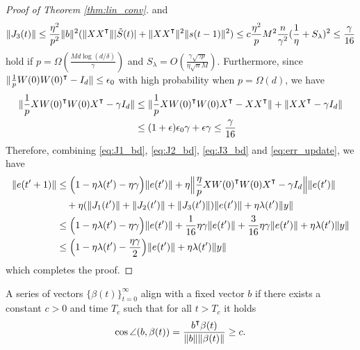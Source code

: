 \begin{proof}[Proof of Theorem \ref{thm:lin_conv}]
and
\begin{equation}
\label{eq:J3_bd}
\|J_3(t)\| \leq \frac{\eta^2}{p^2}\|b\|^2(\|XX\transpose\| |\tilde{S}(t)|+\|XX\transpose\|^2 \|s(t-1)\|^2) \leq c\frac{\eta^2}{p}M^2 \frac{n}{\gamma^2}(\frac{1}{\eta}+S_\lambda)^2\leq \frac{\gamma}{16}
\end{equation}
hold if $p = \Omega(\frac{Md\log(d/\delta)}{\gamma})$ and $S_\lambda = O(\frac{\gamma\sqrt{\gamma p}}{\eta\sqrt{n}M})$. Furthermore, since $\|\frac{1}{p}W(0)W(0)\transpose-I_d\|\leq \epsilon_0$ with high probability when $p=\Omega(d)$, we have
\begin{equation}
\label{eq:xwwx_bd}
\begin{aligned}
\|\frac{1}{p}XW(0)\transpose W(0)X\transpose-\gamma I_d\| 
&\leq \|\frac{1}{p}XW(0)\transpose W(0)X\transpose-XX\transpose\| + \|XX\transpose-\gamma I_d\|  \\
&\leq (1+\epsilon)\epsilon_0\gamma+\epsilon\gamma \leq \frac{\gamma}{16}
\end{aligned}
\end{equation}
Therefore, combining \eqref{eq:J1_bd}, \eqref{eq:J2_bd}, \eqref{eq:J3_bd} and \eqref{eq:err_update}, we have
\begin{equation*}
\begin{aligned}
       \|e(t'+1)\|
       &\leq \Big(1-\eta\lambda(t')-\eta\gamma\Big) \|e(t')\| + \eta\Big\|\frac{\eta}{p}XW(0)\transpose W(0)X\transpose-\gamma I_d\Big\|\|e(t')\|\\
       &\quad + \eta(\|J_1(t')\|+\|J_2(t')\|+\|J_3(t')\|)\|e(t')\| + \eta\lambda(t')\|y\| \\ 
       &\leq \Big(1-\eta\lambda(t')-\eta\gamma\Big)\|e(t')\| + \frac{1}{16}\eta\gamma\|e(t')\|+ \frac{3}{16}\eta\gamma\|e(t')\|  + \eta\lambda(t')\|y\| \\
       &\leq\Big(1-\eta\lambda(t')-\frac{\eta\gamma}{2}\Big)\|e(t')\| +  \eta\lambda(t')\|y\| 
\end{aligned}
\end{equation*}
which completes the proof. 
\end{proof} 

\begin{definition}
    A series of vectors $\{\beta(t)\}_{t=0}^\infty$ align with a fixed vector $b$ if there exists a constant $c>0$ and time $T_c$ such that for all $t > T_c$ it holds
    \begin{align*}
        \cos\angle(b, \beta(t)) = \frac{b\transpose \beta(t)}{\|b\|\|\beta(t)\|} \geq c.
    \end{align*}
\end{definition}

